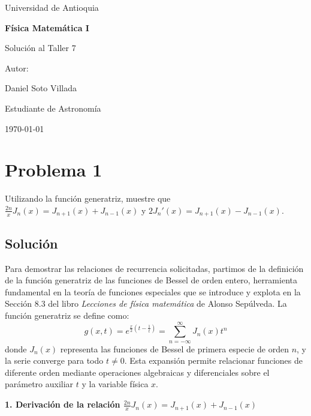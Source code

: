 \documentclass[a4paper]{article}
\begin{document}
\begin{titlepage}
  \centering
  {\Large Universidad de Antioquia\par}
  \vspace{2cm}
  {\huge\bfseries Física Matemática I\par}
  \vspace{0.4cm}
  {\Large Solución al Taller 7 \par}
  \vspace{2.5cm}
  {\large Autor:\par}
  \vspace{0.2cm}
  {\large Daniel Soto Villada\par}
  {\large Estudiante de Astronomía\par}
  \vfill
  {\large \today\par}
\end{titlepage}

\newpage
\tableofcontents
\newpage


\section{Problema 1}
Utilizando la función generatriz, muestre que $\frac{2n}{x}J_n(x) = J_{n+1}(x) + J_{n-1}(x)$ y $2J_n'(x) = J_{n+1}(x) - J_{n-1}(x)$.

\subsection{Solución}
Para demostrar las relaciones de recurrencia solicitadas, partimos de la definición de la función generatriz de las funciones de Bessel de orden entero, herramienta fundamental en la teoría de funciones especiales que se introduce y explota en la Sección 8.3 del libro \textit{Lecciones de física matemática} de Alonso Sepúlveda. La función generatriz se define como:
$$g(x, t) = e^{\frac{x}{2}\left(t - \frac{1}{t}\right)} = \sum_{n=-\infty}^{\infty} J_n(x) t^n$$
donde $J_n(x)$ representa las funciones de Bessel de primera especie de orden $n$, y la serie converge para todo $t \neq 0$. Esta expansión permite relacionar funciones de diferente orden mediante operaciones algebraicas y diferenciales sobre el parámetro auxiliar $t$ y la variable física $x$.

\textbf{1. Derivación de la relación $\frac{2n}{x}J_n(x) = J_{n+1}(x) + J_{n-1}(x)$}
\end{document}
